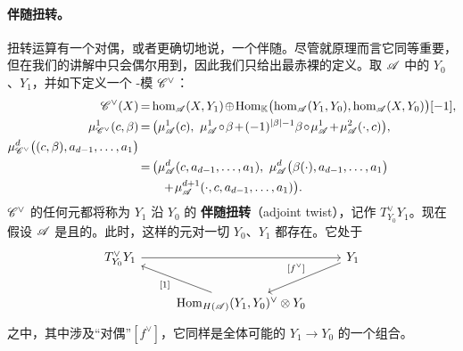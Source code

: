 \paragraph{伴随扭转。}\label{sub:adjoint-twist}
扭转运算有一个对偶，或者更确切地说，一个伴随。尽管就原理而言它同等重要，
但在我们的讲解中只会偶尔用到，因此我们只给出最赤裸的定义。取 \trACategory{}%
$\mathscr{A}$ 中的\trObject{} $Y_0$、$Y_1$，并如下定义一个 \trAinfty-模
$\mathscr{C}^\vee$：
\begin{equation}\label{eq:adjoint-twist-module}
\medmuskip=1.5mu\relax\thickmuskip=3mu\relax
\begin{aligned}
\mathscr{C}^\vee(X)&=\hom_{\scr{A}}(X,Y_1)
\oplus\Hom_{\KK}\bigl(\hom_{\scr{A}}(Y_1,Y_0),\hom_{\scr{A}}(X,Y_0)\bigr)[-1],\\
\mu^1_{\mathscr{C}^\vee}(c,\beta)&=\bigl(\mu^1_{\scr{A}}(c),\
\mu^1_{\scr{A}}\circ\beta+(-1)^{|\beta|-1}\beta\circ\mu^1_{\scr{A}}
+\mu^2_{\scr{A}}(\cdot,c)\bigr),\\
\mu^d_{\mathscr{C}^\vee}\bigl((c,\beta),a_{d-1},\ldots,a_1\bigr)&\\
&=\bigl(\mu^d_{\scr{A}}(c,a_{d-1},\ldots,a_1),\
\mu^d_{\scr{A}}\bigl(\beta(\cdot),a_{d-1},\ldots,a_1\bigr)\\
&\qquad+\mu^{d+1}_{\scr{A}}(\cdot,c,a_{d-1},\ldots,a_1)\bigr).
\end{aligned}
\end{equation}
$\mathscr{C}^\vee$ 的任何\trQuasiRepresent{}元都将称为 $Y_1$ 沿 $Y_0$ 的%
\textbf{伴随扭转}（adjoint twist），记作 $T^\vee_{Y_0}Y_1$。现在假设 $\mathscr{A}$
是\trCfinite{}且\trTriangulated{}的。此时，这样的\trQuasiRepresent{}元对一切
$Y_0$、$Y_1$ 都存在。它处于\trExactTriangle
\begin{equation}\label{eq:adjoint-twist-triangle}
\begin{tikzcd}
T^\vee_{Y_0}Y_1 \ar[rr] && Y_1 \ar[dl,"{[f^\vee]}"{swap,pos=0.45}] \\
& \Hom_{H(\scr{A})}(Y_1,Y_0)^\vee\otimes Y_0 \ar[ul,"{[1]}"{pos=0.55}] &
\end{tikzcd}
\end{equation}
之中，其中涉及“对偶\trEvaluationMap”$[f^\vee]$，它同样是全体可能的\trMorphism{}%
$Y_1\to Y_0$ 的一个组合。
